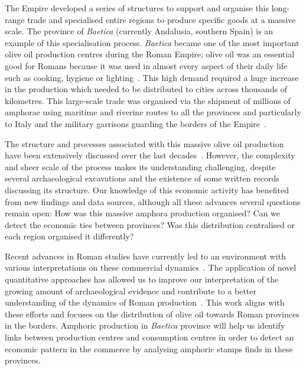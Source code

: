 The Empire developed a series of structures to support and organise this long-range trade and specialised entire regions to produce specific goods at a massive scale. The province of \textit{Baetica} (currently Andalusia, southern Spain) is an example of this specialisation process. \textit{Baetica} became one of the most important olive oil production centres during the Roman Empire; olive oil was an essential good for Romans because it was used in almost every aspect of their daily life such as cooking, hygiene or lighting~\citep{mattingly_d.j._oil_1988}. This high demand required a huge increase in the production which needed to be distributed to cities across thousands of kilometres. This large-scale trade was organised via the shipment of millions of amphorae using maritime and riverine routes to all the provinces and particularly to Italy and the military garrisons guarding the borders of the Empire~\citep{blazquez_exportacion_1980}. 

The structure and processes associated with this massive olive oil production have been extensively discussed over the last decades~\citep{rodriguez_economioleicola_1977, duncan1982economy, Chic_hispania_1997,millet_anforas_1998}. However, the complexity and sheer scale of the process makes its understanding challenging, despite several archaeological excavations and the existence of some written records discussing its structure. Our knowledge of this economic activity has benefited from new findings and data sources, although all these advances several questions remain open: How was this massive amphora production organised? Can we detect the economic ties between provinces? Was this distribution centralised or each region organised it differently?

Recent advances in Roman studies have currently led to an environment with various interpretations on these commercial dynamics~\citep{temin_economy_2006,quantifyingwilson2009}. 
The application of novel quantitative approaches has allowed us to improve our interpretation of the growing amount of archaeological evidence and contribute to a better understanding of the dynamics of Roman production~\citep{brughmans_roman_2016,orengo_seeds_2016,bayesian_2018,coto-sarmiento_identifying_2018,rubio-campillo_ecology_2018}. This work aligns with these efforts and focuses on the distribution of olive oil towards Roman provinces in the borders. Amphoric production in \textit{Baetica} province will help us identify links between production centres and consumption centres in order to detect an economic pattern in the commerce by analysing amphoric stamps finds in these provinces. 

